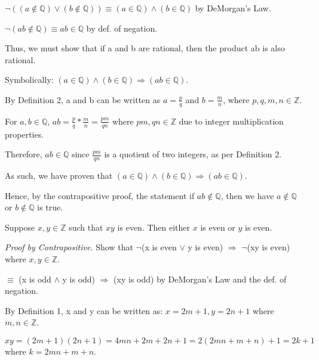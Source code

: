 \documentclass[a4paper,11pt]{article}
\begin{document}
$\neg ((a \not \in \mathbb{Q}) \vee (b \not \in \mathbb{Q})) \equiv (a \in \mathbb{Q}) \land (b \in \mathbb{Q})$ by DeMorgan's Law.

$\neg(ab \not \in \mathbb{Q}) \equiv ab \in \mathbb{Q}$ by def. of negation.

Thus, we must show that if a and b are rational, then the product ab is also rational.

Symbolically: $(a \in \mathbb{Q}) \land (b \in \mathbb{Q}) \Rightarrow (ab \in \mathbb{Q})$.

\phantom{}

By Definition 2, a and b can be written as $a = \frac{p}{q}$ and $b = \frac{m}{n}$, where $p,q,m,n \in \mathbb{Z}$.

For $a,b \in \mathbb{Q}$, $ab = \frac{p}{q}*\frac{m}{n} = \frac{pm}{qn}$ where $pm, qn \in \mathbb{Z}$ due to integer multiplication properties.

Therefore, $ab \in \mathbb{Q}$ since $\frac{pm}{qn}$ is a quotient of two integers, as per Definition 2.

As such, we have proven that $(a \in \mathbb{Q}) \land (b \in \mathbb{Q}) \Rightarrow (ab \in \mathbb{Q})$. 

\phantom{}

Hence, by the contrapositive proof, the statement if $ab \not \in \mathbb{Q}$, then we have $a \not \in \mathbb{Q}$ or $b \not \in \mathbb{Q}$ is true. \fbox \\

\begin{required}
Suppose $x, y \in \mathbb{Z}$ such that $xy$ is even. Then either $x$ is even or $y$ is even.
\end{required}
\emph{Proof by Contrapositive.} Show that $\neg$(x is even $\vee$ y is even) $\Rightarrow$ $\neg$(xy is even) where $x, y \in \mathbb{Z}$.

$\equiv$ (x is odd $\land$ y is odd) $\Rightarrow$ (xy is odd) by DeMorgan's Law and the def. of negation.

\phantom{}

By Definition 1, x and y can be written as: $x = 2m + 1, y = 2n + 1$ where $m,n \in \mathbb{Z}$.

$xy = (2m+1)(2n+1) = 4mn + 2m + 2n + 1 = 2(2mn + m + n) + 1 = 2k + 1$ where $k = 2mn + m + n$.
\end{document}
